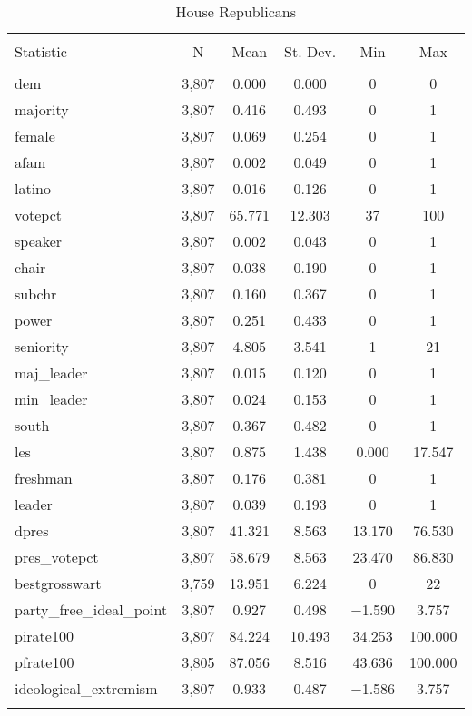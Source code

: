 \documentclass[12pt]{article}
\begin{document}
\begin{table}[ht] \centering 
	\caption{House Republicans} 
	\label{} 
	\begin{tabular}{@{\extracolsep{5pt}}lccccc} 
		\\[-1.8ex]\hline 
		\hline \\[-1.8ex] 
		Statistic & \multicolumn{1}{c}{N} & \multicolumn{1}{c}{Mean} & \multicolumn{1}{c}{St. Dev.} & \multicolumn{1}{c}{Min} & \multicolumn{1}{c}{Max} \\ 
		\hline \\[-1.8ex] 
		dem & 3,807 & 0.000 & 0.000 & 0 & 0 \\ 
		majority & 3,807 & 0.416 & 0.493 & 0 & 1 \\ 
		female & 3,807 & 0.069 & 0.254 & 0 & 1 \\ 
		afam & 3,807 & 0.002 & 0.049 & 0 & 1 \\ 
		latino & 3,807 & 0.016 & 0.126 & 0 & 1 \\ 
		votepct & 3,807 & 65.771 & 12.303 & 37 & 100 \\ 
		speaker & 3,807 & 0.002 & 0.043 & 0 & 1 \\ 
		chair & 3,807 & 0.038 & 0.190 & 0 & 1 \\ 
		subchr & 3,807 & 0.160 & 0.367 & 0 & 1 \\ 
		power & 3,807 & 0.251 & 0.433 & 0 & 1 \\ 
		seniority & 3,807 & 4.805 & 3.541 & 1 & 21 \\ 
		maj\_leader & 3,807 & 0.015 & 0.120 & 0 & 1 \\ 
		min\_leader & 3,807 & 0.024 & 0.153 & 0 & 1 \\ 
		south & 3,807 & 0.367 & 0.482 & 0 & 1 \\ 
		les & 3,807 & 0.875 & 1.438 & 0.000 & 17.547 \\ 
		freshman & 3,807 & 0.176 & 0.381 & 0 & 1 \\ 
		leader & 3,807 & 0.039 & 0.193 & 0 & 1 \\ 
		dpres & 3,807 & 41.321 & 8.563 & 13.170 & 76.530 \\ 
		pres\_votepct & 3,807 & 58.679 & 8.563 & 23.470 & 86.830 \\ 
		bestgrosswart & 3,759 & 13.951 & 6.224 & 0 & 22 \\ 
		party\_free\_ideal\_point & 3,807 & 0.927 & 0.498 & $-$1.590 & 3.757 \\ 
		pirate100 & 3,807 & 84.224 & 10.493 & 34.253 & 100.000 \\ 
		pfrate100 & 3,805 & 87.056 & 8.516 & 43.636 & 100.000 \\ 
		ideological\_extremism & 3,807 & 0.933 & 0.487 & $-$1.586 & 3.757 \\ 
		\hline \\[-1.8ex] 
	\end{tabular} 
\end{table} 
\end{document}
